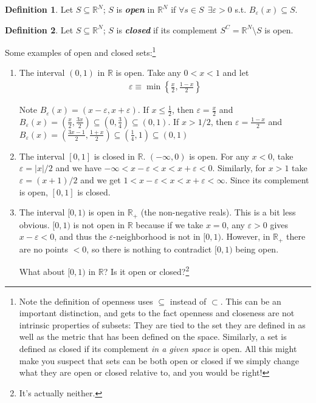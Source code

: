 \documentclass{article}
\newcommand{\R}{\mathbb{R}}
\newcommand{\keyword}[1]{\textit{\textbf{#1}}\index{#1}}
\theoremstyle{definition}
\newtheorem{definition}{Definition}
\begin{document}
\begin{definition}\label{def:lecture1_open_set}
  Let $S \subseteq \R^{N}$; $S$ is \keyword{open} in $\R^N$ if $\forall s \in S ~~ \exists \varepsilon > 0$ s.t. $B_{\varepsilon}(x) \subseteq S$.
\end{definition}

\begin{definition}\label{def:lecture1_closed_set}
  Let $S \subseteq \R^{N}$; $S$ is \keyword{closed} if its complement $S^C = \R^N \setminus S$ is open.
\end{definition}

Some examples of open and closed sets:\footnote{Note the definition of openness uses $\subseteq$ instead of $\subset$. This can be an important distinction, and gets to the fact openness and closeness are not intrinsic properties of subsets: They are tied to the set they are defined in as well as the metric that has been defined on the space. Similarly, a set is defined as closed if its complement \textit{in a given space} is open. All this might make you suspect that sets can be both open or closed if we simply change what they are open or closed relative to, and you would be right!}
\begin{enumerate}
  \item The interval $(0, 1)$ in $\mathbb{R}$ is open. Take any $0 < x < 1$ and let
    \begin{align*}
      \varepsilon \equiv \min \left\{\frac{x}{2}, \frac{1 - x}{2} \right\}
    \end{align*}

    Note $B_{\varepsilon}(x) = (x - \varepsilon, x + \varepsilon)$. If $x \leq \frac{1}{2}$, then $\varepsilon = \frac{x}{2}$ and $B_{\varepsilon}(x) = (\frac{x}{2}, \frac{3x}{2}) \subseteq (0, \frac{3}{4})\subseteq (0,1)$. If $x > 1/2$, then $\varepsilon = \frac{1-x}{2}$ and $B_{\varepsilon}(x) = (\frac{3x-1}{2}, \frac{1+x}{2}) \subseteq (\frac{1}{4}, 1)\subseteq (0,1)$

  \item The interval $[0, 1]$ is closed in $\mathbb{R}$. $(-\infty, 0)$ is open. For any $x < 0$, take $\varepsilon = |x| / 2$ and we have $-\infty < x - \varepsilon < x < x + \varepsilon < 0$. Similarly, for $x > 1$ take $\varepsilon = (x + 1) / 2$ and we get $1 < x - \varepsilon < x < x + \varepsilon < \infty$. Since its complement is open, $[0, 1]$ is closed.

  \item The interval $[0, 1)$ is open in $\mathbb{R}_+$ (the non-negative reals). This is a bit less obvious. $[0, 1)$ is not open in $\mathbb{R}$ because if we take $x = 0$, any $\varepsilon > 0$ gives $x - \varepsilon < 0$, and thus the $\varepsilon$-neighborhood is not in $[0, 1)$. However, in $\mathbb{R}_+$ there are no points $< 0$, so there is nothing to contradict $[0, 1)$ being open.

    What about $[0, 1)$ in $\mathbb{R}$? Is it open or closed?\footnote{It's actually neither.}
\end{enumerate}
\end{document}
